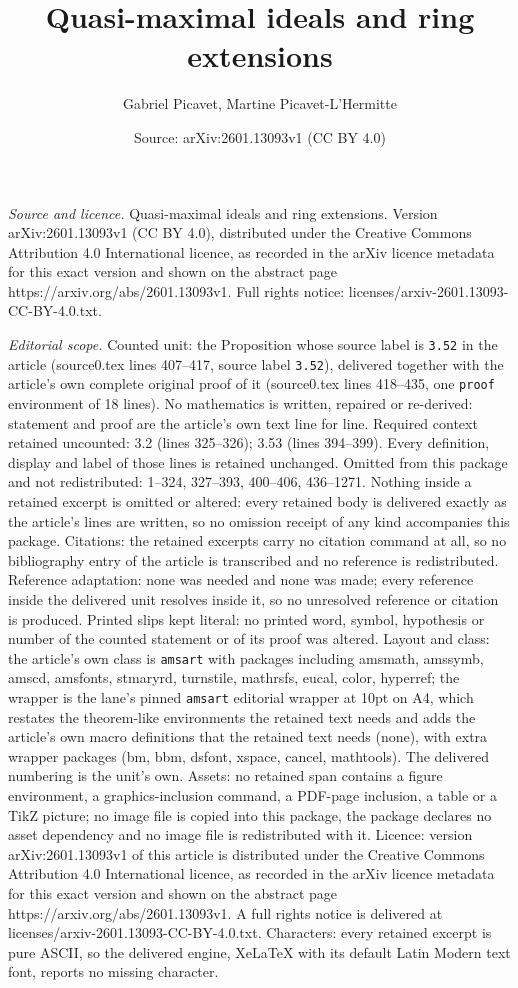 \documentclass[10pt,a4paper]{amsart}
\title[Quasi-maximal ideals and ring extensions]{Quasi-maximal ideals and ring extensions}
\author{Gabriel Picavet, Martine Picavet-L'Hermitte}
\date{Source: arXiv:2601.13093v1 (CC BY 4.0)}
\begin{document}
\maketitle

\noindent\emph{Source and licence.} Quasi-maximal ideals and ring extensions. Version arXiv:2601.13093v1 (CC BY 4.0), distributed under the Creative Commons Attribution 4.0 International licence, as recorded in the arXiv licence metadata for this exact version and shown on the abstract page https://arxiv.org/abs/2601.13093v1. Full rights notice: licenses/arxiv-2601.13093-CC-BY-4.0.txt.\par\smallskip

\noindent\textit{Editorial scope.} Counted unit: the Proposition whose source label is \texttt{3.52} in the article (source0.tex lines 407--417, source label \texttt{3.52}), delivered together with the article's own complete original proof of it (source0.tex lines 418--435, one \texttt{proof} environment of 18 lines). No mathematics is written, repaired or re-derived: statement and proof are the article's own text line for line. Required context retained uncounted: 3.2 (lines 325--326); 3.53 (lines 394--399). Every definition, display and label of those lines is retained unchanged. Omitted from this package and not redistributed: 1--324, 327--393, 400--406, 436--1271. Nothing inside a retained excerpt is omitted or altered: every retained body is delivered exactly as the article's lines are written, so no omission receipt of any kind accompanies this package. Citations: the retained excerpts carry no citation command at all, so no bibliography entry of the article is transcribed and no reference is redistributed. Reference adaptation: none was needed and none was made; every reference inside the delivered unit resolves inside it, so no unresolved reference or citation is produced. Printed slips kept literal: no printed word, symbol, hypothesis or number of the counted statement or of its proof was altered. Layout and class: the article's own class is \texttt{amsart} with packages including amsmath, amssymb, amscd, amsfonts, stmaryrd, turnstile, mathrsfs, eucal, color, hyperref; the wrapper is the lane's pinned \texttt{amsart} editorial wrapper at 10pt on A4, which restates the theorem-like environments the retained text needs and adds the article's own macro definitions that the retained text needs (none), with extra wrapper packages (bm, bbm, dsfont, xspace, cancel, mathtools). The delivered numbering is the unit's own. Assets: no retained span contains a figure environment, a graphics-inclusion command, a PDF-page inclusion, a table or a TikZ picture; no image file is copied into this package, the package declares no asset dependency and no image file is redistributed with it. Licence: version arXiv:2601.13093v1 of this article is distributed under the Creative Commons Attribution 4.0 International licence, as recorded in the arXiv licence metadata for this exact version and shown on the abstract page https://arxiv.org/abs/2601.13093v1. A full rights notice is delivered at licenses/arxiv-2601.13093-CC-BY-4.0.txt. Characters: every retained excerpt is pure ASCII, so the delivered engine, XeLaTeX with its default Latin Modern text font, reports no missing character.
\end{document}
